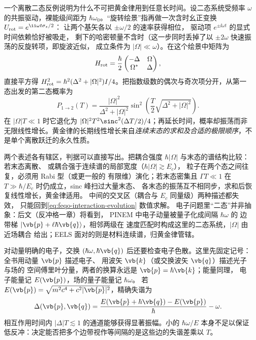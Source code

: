 一个离散二态反例说明为什么不可把黄金律用到任意长时间。设二态系统受频率 \(\omega\) 的共振驱动，裸能级间距为
\(\hbar\omega_0\)。“旋转绘景”指再做一次含时幺正变换
\(U_{\rm rot}=e^{\ii\omega t\sigma_z/2}\)：
让两个基矢各以 \(\pm\omega/2\) 的速率获得相位，
驱动项 \(e^{\pm\ii\omega t}\) 的显式时间依赖恰好被吸走，
剩下的哈密顿量不含时（这一步同时丢掉了以
\(\pm2\omega\) 快速振荡的反旋转项，即旋波近似，
成立条件为 \(|\Omega|\ll\omega\)）。在这个绘景中矩阵为
\[
H_{\rm rot}=\frac{\hbar}{2}
\begin{pmatrix}-\Delta&\Omega\\\Omega^*&\Delta\end{pmatrix},
\]
直接平方得 \(H_{\rm rot}^2=\hbar^2(\Delta^2+|\Omega|^2)I/4\)。把指数级数的偶次与奇次项分开，从第一态出发的第二态概率为
\[
P_{1\to2}(T)=\frac{|\Omega|^2}{\Delta^2+|\Omega|^2}
\sin^2\!\left(\frac{T}{2}\sqrt{\Delta^2+|\Omega|^2}\right).
\]
在 \(|\Omega|T\ll1\) 时它退化为 \(|\Omega|^2T^2\sinc^2(\Delta T/2)/4\)；再延长时间，概率却振荡而非无限线性增长。黄金律的长期线性增长来自\emph{连续末态的求和及合适的极限顺序}，不是单个离散跃迁的永久性质。

两个表述各有辖区，判据可以直接写出。把耦合强度
\(\hbar|\Omega|\) 与末态的谱结构比较：若末态离散、
或耦合强于连续谱的局部宽度（\(\hbar|\Omega|\gtrsim E_c\)），
粒子在两个态之间往复，必须用 Rabi 型（或更一般的
有限维）演化；若末态密集且 \(\Gamma T\ll1\)
在 \(T\gg\hbar/E_c\) 时仍成立，sinc 峰扫过大量末态、
各末态的振荡互不相同步，求和后恢复线性增长，黄金律适用。
中间的交叉区（耦合与 \(E_c\) 同量级）两种描述都失效，
只能回到\cref{eq:feqo-interaction-evolution} 数值求解。
电子问题里“二态”并非抽象：后文（反冲格一章）将看到，
PINEM 中电子动量被量子化成间隔 \(\hbar\omega\) 的
边带梯 \(|\vb{p}+\ell\hbar\vb{q}\rangle\)，相邻两级在
速度匹配时构成这里的二态系统，\(|\Omega|\) 由近场耦合
给出；EELS 面对的则是材料连续谱，归黄金律管辖。

对动量明确的电子，交换 \((\hbar\omega,\hbar\vb{q})\) 后还要检查电子色散。这里先固定记号：全书用动量 \(\vb{p}\) 描述电子、
用波矢 \(\vb{k}\)（或交换波矢 \(\vb{q}\)）描述光子与场的
空间傅里叶分量，两者的换算永远是
\(\vb{p}=\hbar\vb{k}\)；能量同理，
电子能量记 \(E(\vb{p})\)，场的量子能量记 \(\hbar\omega\)。
若 \(E(\vb{p})=\sqrt{m^2c^4+c^2|\vb{p}|^2}\)，精确失谐为
\begin{equation}
\Delta(\vb{p},\vb{q})=\frac{E(\vb{p}+\hbar\vb{q})-E(\vb{p})}{\hbar}-\omega .
\label{eq:feqo-recoil-detuning}
\end{equation}
相互作用时间内 \(|\Delta|T\lesssim1\) 的通道能够获得显著振幅。小的 \(\hbar\omega/E\) 本身不足以保证低反冲：决定能否把多个边带视作等间隔的是这些边的失谐差乘以 \(T\)。

